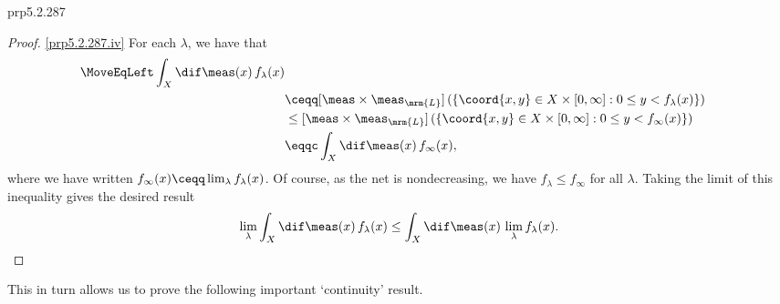 \begin{thm}{}{prp5.2.287}
\begin{proof}
\blankline
\noindent
\cref{prp5.2.287.iv} For each $\lambda$, we have that
\begin{equation}
\begin{split}
\MoveEqLeft
\int _X\dif \meas (x)\, f_{\lambda}(x) \\
& \ceqq [\meas \times \meas _{\mrm{L}}]\left( \left\{ \coord{x,y}\in X\times [0,\infty ]:0\leq y<f_{\lambda}(x)\right\} \right) \\
& \leq [\meas \times \meas _{\mrm{L}}]\left( \left\{ \coord{x,y}\in X\times [0,\infty ]:0\leq y<f_{\infty}(x)\right\} \right) \\
& \eqqc \int _X\dif \meas (x)\, f_{\infty}(x),
\end{split}
\end{equation}
where we have written $f_{\infty}(x)\ceqq \lim _{\lambda}f_{\lambda}(x)$.  Of course, as the net is nondecreasing, we have $f_{\lambda}\leq f_{\infty}$ for all $\lambda$.  Taking the limit of this inequality gives the desired result
\begin{equation}
\lim _{\lambda}\int _X\dif \meas (x)\, f_{\lambda}(x)\leq \int _X\dif \meas (x)\, \lim _{\lambda}f_{\lambda}(x).
\end{equation}
\end{proof}
\end{thm}
This in turn allows us to prove the following important `continuity' result.

